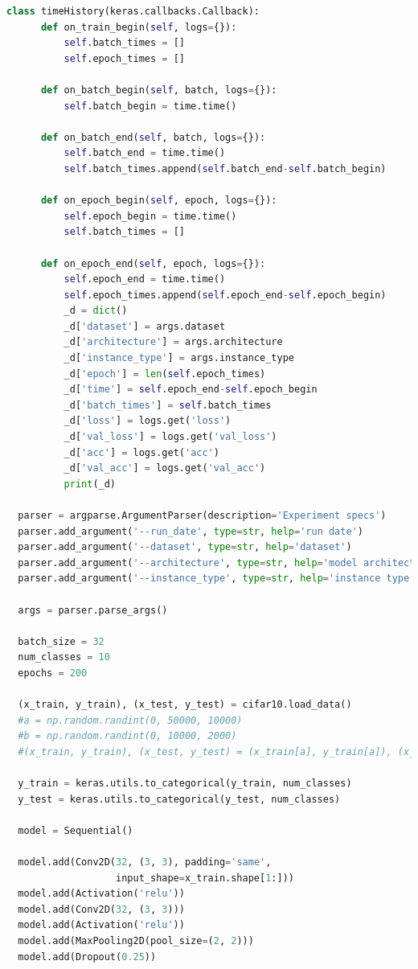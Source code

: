 \documentclass[12pt,a4paper,twoside]{article}
\begin{document}
\begin{appendices}
\begin{lstlisting}[language=python]
  class timeHistory(keras.callbacks.Callback):
      def on_train_begin(self, logs={}):
          self.batch_times = []
          self.epoch_times = []

      def on_batch_begin(self, batch, logs={}):
          self.batch_begin = time.time()

      def on_batch_end(self, batch, logs={}):
          self.batch_end = time.time()
          self.batch_times.append(self.batch_end-self.batch_begin)

      def on_epoch_begin(self, epoch, logs={}):
          self.epoch_begin = time.time()
          self.batch_times = []

      def on_epoch_end(self, epoch, logs={}):
          self.epoch_end = time.time()
          self.epoch_times.append(self.epoch_end-self.epoch_begin)
          _d = dict()
          _d['dataset'] = args.dataset
          _d['architecture'] = args.architecture
          _d['instance_type'] = args.instance_type
          _d['epoch'] = len(self.epoch_times)
          _d['time'] = self.epoch_end-self.epoch_begin
          _d['batch_times'] = self.batch_times
          _d['loss'] = logs.get('loss')
          _d['val_loss'] = logs.get('val_loss')
          _d['acc'] = logs.get('acc')
          _d['val_acc'] = logs.get('val_acc')
          print(_d)

  parser = argparse.ArgumentParser(description='Experiment specs')
  parser.add_argument('--run_date', type=str, help='run date')
  parser.add_argument('--dataset', type=str, help='dataset')
  parser.add_argument('--architecture', type=str, help='model architecture')
  parser.add_argument('--instance_type', type=str, help='instance type')

  args = parser.parse_args()

  batch_size = 32
  num_classes = 10
  epochs = 200

  (x_train, y_train), (x_test, y_test) = cifar10.load_data()
  #a = np.random.randint(0, 50000, 10000)
  #b = np.random.randint(0, 10000, 2000)
  #(x_train, y_train), (x_test, y_test) = (x_train[a], y_train[a]), (x_test[b], y_test[b])

  y_train = keras.utils.to_categorical(y_train, num_classes)
  y_test = keras.utils.to_categorical(y_test, num_classes)

  model = Sequential()

  model.add(Conv2D(32, (3, 3), padding='same',
                   input_shape=x_train.shape[1:]))
  model.add(Activation('relu'))
  model.add(Conv2D(32, (3, 3)))
  model.add(Activation('relu'))
  model.add(MaxPooling2D(pool_size=(2, 2)))
  model.add(Dropout(0.25))


\end{lstlisting}
\end{appendices}
\end{document}
